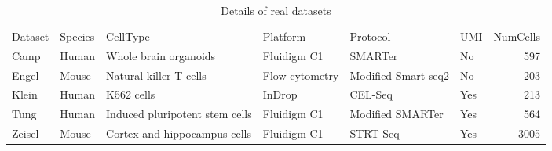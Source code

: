 \begin{table}
\caption{\label{tab:datasets}Details of real datasets}
\begin{tabular}[t]{l l l l l l r}
Dataset & Species & CellType & Platform & Protocol & UMI & NumCells\\
Camp & Human & Whole brain organoids & Fluidigm C1 & SMARTer & No & 597\\
Engel & Mouse & Natural killer T cells & Flow cytometry & Modified Smart-seq2 & No & 203\\
Klein & Human & K562 cells & InDrop & CEL-Seq & Yes & 213\\
Tung & Human & Induced pluripotent stem cells & Fluidigm C1 & Modified SMARTer & Yes & 564\\
Zeisel & Mouse & Cortex and hippocampus cells & Fluidigm C1 & STRT-Seq & Yes & 3005\\
\end{tabular}
\end{table}